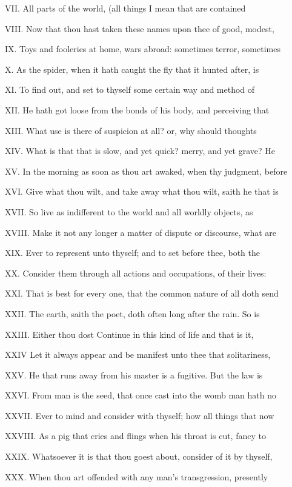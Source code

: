 VII. All parts of the world, (all things I
mean that are contained

VIII. Now that thou hast taken these names
upon thee of good, modest,

IX. Toys and fooleries at home, wars abroad:
sometimes terror, sometimes

X. As the spider, when it hath caught the fly
that it hunted after, is

XI. To find out, and set to thyself some
certain way and method of

XII. He hath got loose from the bonds of his
body, and perceiving that

XIII. What use is there of suspicion at all?
or, why should thoughts

XIV. What is that that is slow, and yet quick?
merry, and yet grave? He

XV. In the morning as soon as thou art awaked,
when thy judgment, before

XVI. Give what thou wilt, and take away what
thou wilt, saith he that is

XVII. So live as indifferent to the world and
all worldly objects, as

XVIII. Make it not any longer a matter of
dispute or discourse, what are

XIX. Ever to represent unto thyself; and to
set before thee, both the

XX. Consider them through all actions and
occupations, of their lives:

XXI. That is best for every one, that the
common nature of all doth send

XXII. The earth, saith the poet, doth often
long after the rain. So is

XXIII. Either thou dost Continue in this kind
of life and that is it,

XXIV Let it always appear and be manifest unto
thee that solitariness,

XXV. He that runs away from his master is a
fugitive. But the law is

XXVI. From man is the seed, that once cast
into the womb man hath no

XXVII. Ever to mind and consider with thyself;
how all things that now

XXVIII. As a pig that cries and flings when
his throat is cut, fancy to

XXIX. Whatsoever it is that thou goest about,
consider of it by thyself,

XXX. When thou art offended with any man's
transgression, presently

